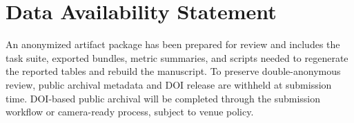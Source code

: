 \section*{Data Availability Statement}

An anonymized artifact package has been prepared for review and includes the task suite, exported bundles, metric summaries, and scripts needed to regenerate the reported tables and rebuild the manuscript. To preserve double-anonymous review, public archival metadata and DOI release are withheld at submission time. DOI-based public archival will be completed through the submission workflow or camera-ready process, subject to venue policy.
